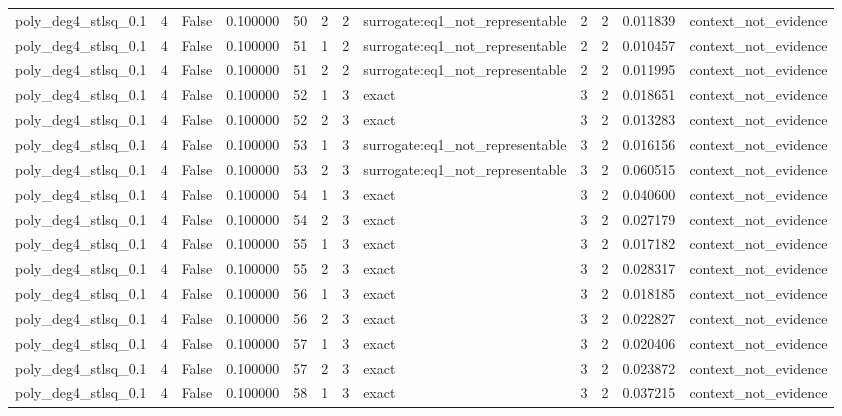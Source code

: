 \begin{tabular}{lrrrrrrlrrrl}
poly\_deg4\_stlsq\_0.1 & 4 & False & 0.100000 & 50 & 2 & 2 & surrogate:eq1\_not\_representable & 2 & 2 & 0.011839 & context\_not\_evidence \\
poly\_deg4\_stlsq\_0.1 & 4 & False & 0.100000 & 51 & 1 & 2 & surrogate:eq1\_not\_representable & 2 & 2 & 0.010457 & context\_not\_evidence \\
poly\_deg4\_stlsq\_0.1 & 4 & False & 0.100000 & 51 & 2 & 2 & surrogate:eq1\_not\_representable & 2 & 2 & 0.011995 & context\_not\_evidence \\
poly\_deg4\_stlsq\_0.1 & 4 & False & 0.100000 & 52 & 1 & 3 & exact & 3 & 2 & 0.018651 & context\_not\_evidence \\
poly\_deg4\_stlsq\_0.1 & 4 & False & 0.100000 & 52 & 2 & 3 & exact & 3 & 2 & 0.013283 & context\_not\_evidence \\
poly\_deg4\_stlsq\_0.1 & 4 & False & 0.100000 & 53 & 1 & 3 & surrogate:eq1\_not\_representable & 3 & 2 & 0.016156 & context\_not\_evidence \\
poly\_deg4\_stlsq\_0.1 & 4 & False & 0.100000 & 53 & 2 & 3 & surrogate:eq1\_not\_representable & 3 & 2 & 0.060515 & context\_not\_evidence \\
poly\_deg4\_stlsq\_0.1 & 4 & False & 0.100000 & 54 & 1 & 3 & exact & 3 & 2 & 0.040600 & context\_not\_evidence \\
poly\_deg4\_stlsq\_0.1 & 4 & False & 0.100000 & 54 & 2 & 3 & exact & 3 & 2 & 0.027179 & context\_not\_evidence \\
poly\_deg4\_stlsq\_0.1 & 4 & False & 0.100000 & 55 & 1 & 3 & exact & 3 & 2 & 0.017182 & context\_not\_evidence \\
poly\_deg4\_stlsq\_0.1 & 4 & False & 0.100000 & 55 & 2 & 3 & exact & 3 & 2 & 0.028317 & context\_not\_evidence \\
poly\_deg4\_stlsq\_0.1 & 4 & False & 0.100000 & 56 & 1 & 3 & exact & 3 & 2 & 0.018185 & context\_not\_evidence \\
poly\_deg4\_stlsq\_0.1 & 4 & False & 0.100000 & 56 & 2 & 3 & exact & 3 & 2 & 0.022827 & context\_not\_evidence \\
poly\_deg4\_stlsq\_0.1 & 4 & False & 0.100000 & 57 & 1 & 3 & exact & 3 & 2 & 0.020406 & context\_not\_evidence \\
poly\_deg4\_stlsq\_0.1 & 4 & False & 0.100000 & 57 & 2 & 3 & exact & 3 & 2 & 0.023872 & context\_not\_evidence \\
poly\_deg4\_stlsq\_0.1 & 4 & False & 0.100000 & 58 & 1 & 3 & exact & 3 & 2 & 0.037215 & context\_not\_evidence \\

\end{tabular}
